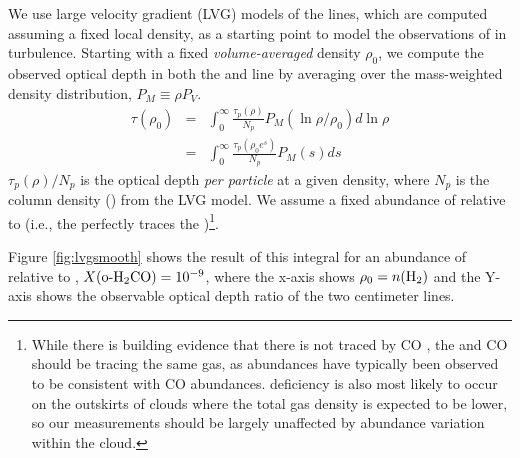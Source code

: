 We use large velocity gradient (LVG) models of the \formaldehyde lines, which are computed assuming a
fixed local density, as a starting point to model the observations of
\formaldehyde in turbulence.   Starting with a fixed \emph{volume-averaged}
density $\rho_0$, we compute the observed \formaldehyde optical depth in both
the \oneone and \twotwo
line by averaging over the mass-weighted density distribution, $P_M\equiv\rho P_V$.
\begin{eqnarray}
    \label{eqn:tauintegral}
    \tau(\rho_0) &=& \int_{0}^\infty \frac{\tau_p(\rho)}{N_p} P_M(\ln \rho/\rho_0) d \ln \rho\\
                 &=& \int_{0}^\infty \frac{\tau_p(\rho_0 e^s)}{N_p} P_M(s) d s
\end{eqnarray} %
$\tau_p(\rho)/N_p$ is the optical depth \emph{per particle} at a given density, where $N_p$ is the column
density (\perkmspc) from the LVG model.
We assume a fixed abundance of \ortho relative to \hh
(i.e., the \formaldehyde perfectly traces the \hh)\footnote{While there is
building evidence that there is \hh not traced by CO
\citep{Shetty2011b,Shetty2011a}, the \formaldehyde and CO should be tracing the
same gas, as \formaldehyde abundances have typically been observed to be
consistent with CO abundances.  \formaldehyde deficiency is also most likely to
occur on the outskirts of clouds where the total gas density is expected to be
lower, so our measurements should be largely unaffected by abundance variation
within the cloud.}.

Figure \ref{fig:lvgsmooth}
shows the result of this integral for an abundance of \ortho relative to \hh, 
$X(\textrm{o-H}_2\textrm{CO})=10^{-9}$, where the x-axis shows $\rho_0 = n(\textrm{H}_{2})$ and the Y-axis
shows the observable optical depth ratio of the two \formaldehyde centimeter
lines.



